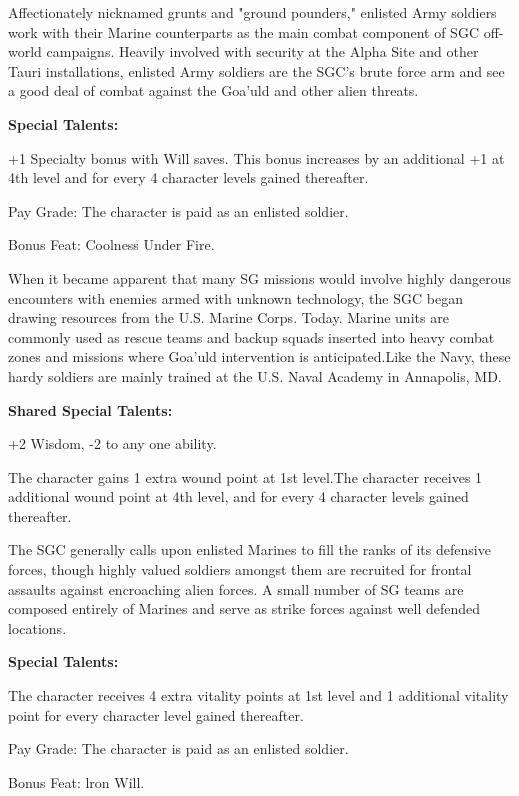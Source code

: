 Affectionately nicknamed grunts and "ground pounders," enlisted Army soldiers work with their Marine counterparts as the main combat component of SGC off-world campaigns. Heavily involved with security at the Alpha Site and other Tauri installations, enlisted Army soldiers are the SGC's brute force arm and see a good deal of combat against the Goa'uld and other alien threats.

\textbf{Special Talents:}
\begin{itemize*}
\item +1 Specialty bonus with Will saves. This bonus increases by an additional +1 at 4th level and for every 4 character levels gained thereafter.
\item Pay Grade: The character is paid as an enlisted soldier.
\item Bonus Feat: Coolness Under Fire.
\end{itemize*}

When it became apparent that many SG missions would involve highly dangerous encounters with enemies armed with unknown technology, the SGC began drawing resources from the U.S. Marine Corps. Today. Marine units are commonly used as rescue teams and backup squads inserted into heavy combat zones and missions where Goa'uld intervention is anticipated.Like the Navy, these hardy soldiers are mainly trained at the U.S. Naval Academy in Annapolis, MD.

\textbf{Shared Special Talents:}
\begin{itemize*}
\item +2 Wisdom, -2 to any one ability.
\item The character gains 1 extra wound point at 1st level.The character receives 1 additional wound point at 4th level, and for every 4 character levels gained thereafter.
\end{itemize*}

The SGC generally calls upon enlisted Marines to fill the ranks of its defensive forces, though highly valued soldiers amongst them are recruited for frontal assaults against encroaching alien forces. A small number of SG teams are composed entirely of Marines and serve as strike forces against well defended locations.

\textbf{Special Talents:}
\begin{itemize*}
\item The character receives 4 extra vitality points at 1st level and 1 additional vitality point for every character level gained thereafter.
\item Pay Grade: The character is paid as an enlisted soldier.
\item Bonus Feat: lron Will.
\end{itemize*}

